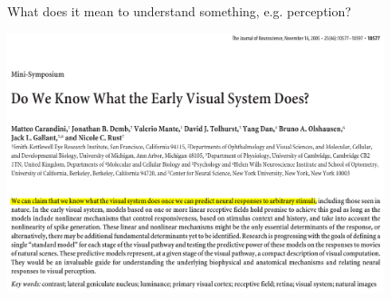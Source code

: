\documentclass[]{beamer}
\begin{document}
\begin{frame}
\begin{overlayarea}{120mm}{70mm}
\begin{center}
  What does it mean to understand something, e.g. perception? 
\end{center}


\end{overlayarea}
\end{frame}


\begin{frame}
  \begin{center}  
\includegraphics[width=110mm]{figs/what_early_visual_system.png}
  \end{center}
\end{frame}
\end{document}

